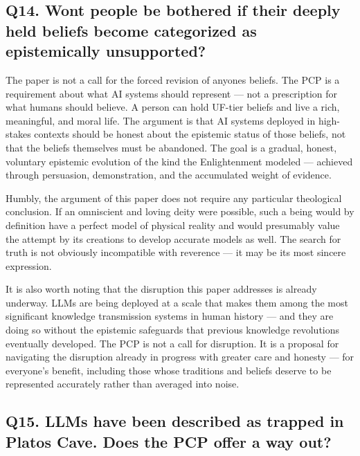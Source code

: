 \documentclass[12pt]{article}
\begin{document}
\subsection{Q14. Won\textquotesingle t people be bothered if their
deeply held beliefs become categorized as epistemically
unsupported?}\label{q14.-wont-people-be-bothered-if-their-deeply-held-beliefs-become-categorized-as-epistemically-unsupported}

The paper is not a call for the forced revision of
anyone\textquotesingle s beliefs. The PCP is a requirement about what AI
systems should represent --- not a prescription for what humans should
believe. A person can hold UF-tier beliefs and live a rich, meaningful,
and moral life. The argument is that AI systems deployed in high-stakes
contexts should be honest about the epistemic status of those beliefs,
not that the beliefs themselves must be abandoned. The goal is a
gradual, honest, voluntary epistemic evolution of the kind the
Enlightenment modeled --- achieved through persuasion, demonstration,
and the accumulated weight of evidence.

Humbly, the argument of this paper does not require any particular
theological conclusion. If an omniscient and loving deity were possible,
such a being would by definition have a perfect model of physical
reality and would presumably value the attempt by its creations to
develop accurate models as well. The search for truth is not obviously
incompatible with reverence --- it may be its most sincere expression.

It is also worth noting that the disruption this paper addresses is
already underway. LLMs are being deployed at a scale that makes them
among the most significant knowledge transmission systems in human
history --- and they are doing so without the epistemic safeguards that
previous knowledge revolutions eventually developed. The PCP is not a
call for disruption. It is a proposal for navigating the disruption
already in progress with greater care and honesty --- for everyone's
benefit, including those whose traditions and beliefs deserve to be
represented accurately rather than averaged into noise.

\subsection{Q15. LLMs have been described as trapped in
Plato\textquotesingle s Cave. Does the PCP offer a way
out?}\label{q15.-llms-have-been-described-as-trapped-in-platos-cave.-does-the-pcp-offer-a-way-out}
\end{document}
